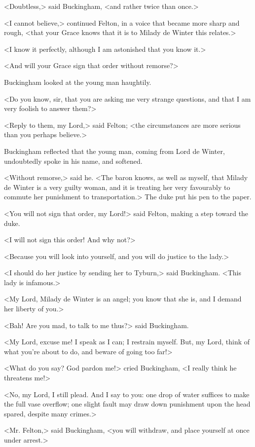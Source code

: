 <Doubtless,> said Buckingham, <and rather twice than once.> 

<I cannot believe,> continued Felton, in a voice that became more sharp and rough, <that your Grace knows that it is to Milady de Winter this relates.> 

<I know it perfectly, although I am astonished that you know it.> 

<And will your Grace sign that order without remorse?> 

Buckingham looked at the young man haughtily. 

<Do you know, sir, that you are asking me very strange questions, and that I am very foolish to answer them?> 

<Reply to them, my Lord,> said Felton; <the circumstances are more serious than you perhaps believe.> 

Buckingham reflected that the young man, coming from Lord de Winter, undoubtedly spoke in his name, and softened. 

<Without remorse,> said he. <The baron knows, as well as myself, that Milady de Winter is a very guilty woman, and it is treating her very favourably to commute her punishment to transportation.> The duke put his pen to the paper. 

<You will not sign that order, my Lord!> said Felton, making a step toward the duke. 

<I will not sign this order! And why not?> 

<Because you will look into yourself, and you will do justice to the lady.> 

<I should do her justice by sending her to Tyburn,> said Buckingham. <This lady is infamous.> 

<My Lord, Milady de Winter is an angel; you know that she is, and I demand her liberty of you.> 

<Bah! Are you mad, to talk to me thus?> said Buckingham. 

<My Lord, excuse me! I speak as I can; I restrain myself. But, my Lord, think of what you're about to do, and beware of going too far!> 

<What do you say? God pardon me!> cried Buckingham, <I really think he threatens me!> 

<No, my Lord, I still plead. And I say to you: one drop of water suffices to make the full vase overflow; one slight fault may draw down punishment upon the head spared, despite many crimes.> 

<Mr. Felton,> said Buckingham, <you will withdraw, and place yourself at once under arrest.> 

